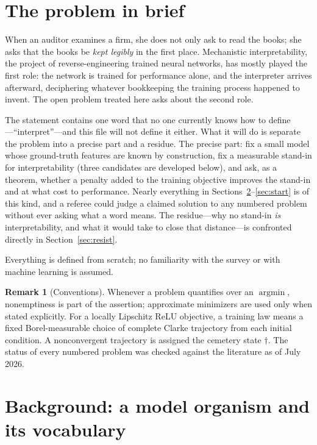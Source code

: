 \documentclass[11pt]{amsart}
\theoremstyle{plain}
\theoremstyle{definition}
\newtheorem{remark}[theorem]{Remark}
\begin{document}
\section{The problem in brief}

When an auditor examines a firm, she does not only ask to read the books; she asks that the books be \emph{kept legibly} in the first place. Mechanistic interpretability, the project of reverse-engineering trained neural networks, has mostly played the first role: the network is trained for performance alone, and the interpreter arrives afterward, deciphering whatever bookkeeping the training process happened to invent. The open problem treated here asks about the second role.



The statement contains one word that no one currently knows how to define---``interpret''---and this file will not define it either. What it will do is separate the problem into a precise part and a residue. The precise part: fix a small model whose ground-truth features are known by construction, fix a measurable stand-in for interpretability (three candidates are developed below), and ask, as a theorem, whether a penalty added to the training objective improves the stand-in and at what cost to performance. Nearly everything in Sections~\ref{sec:background}--\ref{sec:start} is of this kind, and a referee could judge a claimed solution to any numbered problem without ever asking what a word means. The residue---why no stand-in \emph{is} interpretability, and what it would take to close that distance---is confronted directly in Section~\ref{sec:resist}.

Everything is defined from scratch; no familiarity with the survey or with machine learning is assumed.

\begin{remark}[Conventions]\label{rem:attain}
Whenever a problem quantifies over an $\operatorname{argmin}$, nonemptiness is part of the assertion; approximate minimizers are used only when stated explicitly. For a locally Lipschitz ReLU objective, a training law means a fixed Borel-measurable choice of complete Clarke trajectory from each initial condition. A nonconvergent trajectory is assigned the cemetery state $\dagger$. The status of every numbered problem was checked against the literature as of July 2026.
\end{remark}

\section{Background: a model organism and its vocabulary}\label{sec:background}
\end{document}
